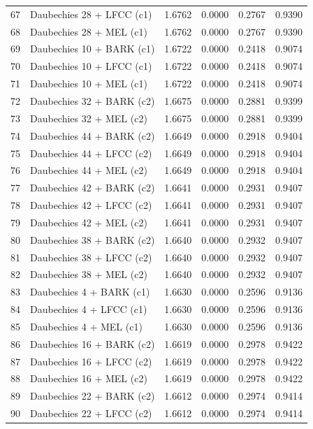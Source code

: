\begin{longtable}{@{}rlrrrr@{}}
67 & Daubechies 28 + LFCC (c1) & 1.6762 & 0.0000 & 0.2767 & 0.9390 \\
68 & Daubechies 28 + MEL (c1) & 1.6762 & 0.0000 & 0.2767 & 0.9390 \\
69 & Daubechies 10 + BARK (c1) & 1.6722 & 0.0000 & 0.2418 & 0.9074 \\
70 & Daubechies 10 + LFCC (c1) & 1.6722 & 0.0000 & 0.2418 & 0.9074 \\
71 & Daubechies 10 + MEL (c1) & 1.6722 & 0.0000 & 0.2418 & 0.9074 \\
72 & Daubechies 32 + BARK (c2) & 1.6675 & 0.0000 & 0.2881 & 0.9399 \\
73 & Daubechies 32 + MEL (c2) & 1.6675 & 0.0000 & 0.2881 & 0.9399 \\
74 & Daubechies 44 + BARK (c2) & 1.6649 & 0.0000 & 0.2918 & 0.9404 \\
75 & Daubechies 44 + LFCC (c2) & 1.6649 & 0.0000 & 0.2918 & 0.9404 \\
76 & Daubechies 44 + MEL (c2) & 1.6649 & 0.0000 & 0.2918 & 0.9404 \\
77 & Daubechies 42 + BARK (c2) & 1.6641 & 0.0000 & 0.2931 & 0.9407 \\
78 & Daubechies 42 + LFCC (c2) & 1.6641 & 0.0000 & 0.2931 & 0.9407 \\
79 & Daubechies 42 + MEL (c2) & 1.6641 & 0.0000 & 0.2931 & 0.9407 \\
80 & Daubechies 38 + BARK (c2) & 1.6640 & 0.0000 & 0.2932 & 0.9407 \\
81 & Daubechies 38 + LFCC (c2) & 1.6640 & 0.0000 & 0.2932 & 0.9407 \\
82 & Daubechies 38 + MEL (c2) & 1.6640 & 0.0000 & 0.2932 & 0.9407 \\
83 & Daubechies 4 + BARK (c1) & 1.6630 & 0.0000 & 0.2596 & 0.9136 \\
84 & Daubechies 4 + LFCC (c1) & 1.6630 & 0.0000 & 0.2596 & 0.9136 \\
85 & Daubechies 4 + MEL (c1) & 1.6630 & 0.0000 & 0.2596 & 0.9136 \\
86 & Daubechies 16 + BARK (c2) & 1.6619 & 0.0000 & 0.2978 & 0.9422 \\
87 & Daubechies 16 + LFCC (c2) & 1.6619 & 0.0000 & 0.2978 & 0.9422 \\
88 & Daubechies 16 + MEL (c2) & 1.6619 & 0.0000 & 0.2978 & 0.9422 \\
89 & Daubechies 22 + BARK (c2) & 1.6612 & 0.0000 & 0.2974 & 0.9414 \\
90 & Daubechies 22 + LFCC (c2) & 1.6612 & 0.0000 & 0.2974 & 0.9414 \\

\end{longtable}
